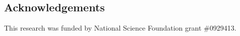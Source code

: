 \documentclass[aspb,landscape]{a0poster}
\begin{document}
\begin{multicols}{3}
  \nocite{*} %


  \section*{Acknowledgements}
  
  \noindent This research was funded by National Science Foundation grant \#0929413.

  
\end{multicols}
\end{document}
